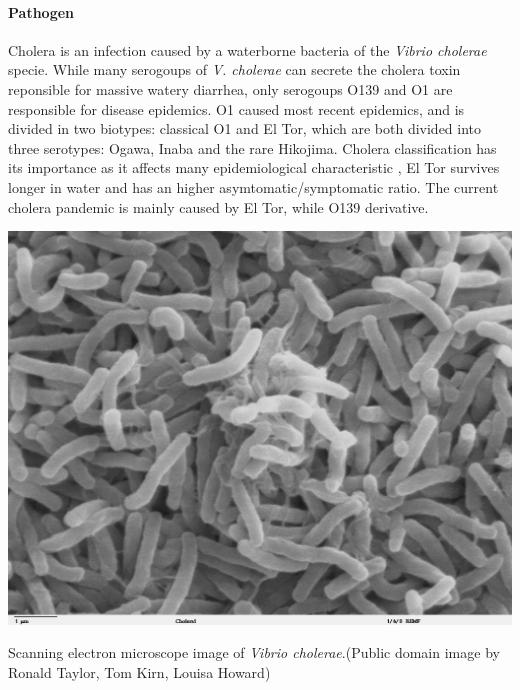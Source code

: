 \paragraph{Pathogen} Cholera is an infection caused by a waterborne bacteria of the \emph{Vibrio cholerae} specie. While many serogoups of \emph{V. cholerae} can secrete the cholera toxin reponsible for massive watery diarrhea, only serogoups O139 and O1 are responsible for disease epidemics. O1 caused most recent epidemics, and is divided in two biotypes: classical O1 and El Tor, which are both divided into three serotypes: Ogawa, Inaba and the rare Hikojima\cite{Kaper:Cholera:1995}. Cholera classification has its importance as it affects many epidemiological characteristic \eg, El Tor survives longer in water and has an higher asymtomatic/symptomatic ratio\cite{WHO:CholeraVaccinesWHO:2017}. The current cholera pandemic is mainly caused by El Tor, while O139 derivative. 

\begin{marginfigure}
\centering
\includegraphics{fig/vibrio}
\caption[Vibrio cholerae bacteria]{Scanning electron microscope image of \textit{Vibrio cholerae}.\small{(Public domain image by Ronald Taylor, Tom Kirn, Louisa Howard)}}
\label{rain}
\end{marginfigure}


